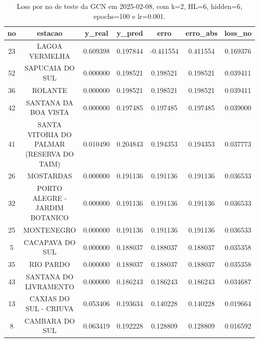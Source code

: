 \begin{table}[h]
\centering
\caption{Loss por no de teste da GCN em 2025-02-08, com k=2, HL=6, hidden=6, epochs=100 e lr=0.001.}
\label{tab:gcn_loss_k2_hl6_h6_e100_d20250208}
\begin{tabular}{ccccccc}
\toprule
no & estacao & y\_real & y\_pred & erro & erro\_abs & loss\_no \\
\midrule
23 & LAGOA VERMELHA & 0.609398 & 0.197844 & -0.411554 & 0.411554 & 0.169376 \\
52 & SAPUCAIA DO SUL & 0.000000 & 0.198521 & 0.198521 & 0.198521 & 0.039411 \\
36 & ROLANTE & 0.000000 & 0.198521 & 0.198521 & 0.198521 & 0.039411 \\
42 & SANTANA DA BOA VISTA & 0.000000 & 0.197485 & 0.197485 & 0.197485 & 0.039000 \\
41 & SANTA VITORIA DO PALMAR (RESERVA DO TAIM) & 0.010490 & 0.204843 & 0.194353 & 0.194353 & 0.037773 \\
26 & MOSTARDAS & 0.000000 & 0.191136 & 0.191136 & 0.191136 & 0.036533 \\
32 & PORTO ALEGRE - JARDIM BOTANICO & 0.000000 & 0.191136 & 0.191136 & 0.191136 & 0.036533 \\
25 & MONTENEGRO & 0.000000 & 0.191136 & 0.191136 & 0.191136 & 0.036533 \\
5 & CACAPAVA DO SUL & 0.000000 & 0.188037 & 0.188037 & 0.188037 & 0.035358 \\
35 & RIO PARDO & 0.000000 & 0.188037 & 0.188037 & 0.188037 & 0.035358 \\
43 & SANTANA DO LIVRAMENTO & 0.000000 & 0.186243 & 0.186243 & 0.186243 & 0.034687 \\
13 & CAXIAS DO SUL - CRIUVA & 0.053406 & 0.193634 & 0.140228 & 0.140228 & 0.019664 \\
8 & CAMBARA DO SUL & 0.063419 & 0.192228 & 0.128809 & 0.128809 & 0.016592 \\
\bottomrule
\end{tabular}
\end{table}
